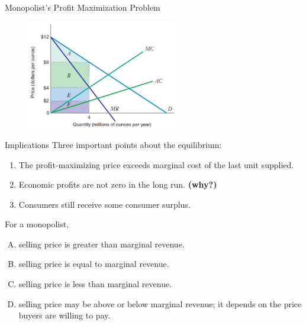 \documentclass[11pt,t]{beamer}
\begin{document}
\begin{frame}{Monopolist's Profit Maximization Problem}
  \begin{figure}
    \includegraphics[width=250px]{figures/fig11_5.jpg}
  \end{figure}
\end{frame}

\begin{frame}{Implications}
  Three important points about the equilibrium:

  \bigskip
  \begin{enumerate}
    \item The profit-maximizing price exceeds marginal cost of the last unit supplied.

    \item Economic profits are not zero in the long run. \textbf{(why?)}

    \item Consumers still receive some consumer surplus.
  \end{enumerate}
\end{frame}

\begin{frame}{}
  For a monopolist,
  \begin{enumerate}[A)]
    \item selling price is greater than marginal revenue.
    \item selling price is equal to marginal revenue.
    \item selling price is less than marginal revenue.
    \item selling price may be above or below marginal revenue; it depends on the price buyers are willing to pay.
  \end{enumerate}
\end{frame}
\end{document}
